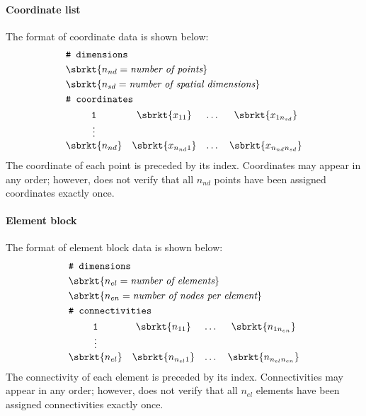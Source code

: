\paragraph{Coordinate list}
\label{sect.TahoeI.coordinates}
The format of coordinate data is shown below:
\begin{align}
& \texttt{\# dimensions} \notag \\
& \sbrkt{n_{nd} = \textit{number of points}} \notag \\
& \sbrkt{n_{sd} = \textit{number of spatial dimensions}} \notag \\
& \texttt{\# coordinates} \notag \\
& \begin{matrix}
\texttt{1} & \sbrkt{x_{11}} & \dots  & \sbrkt{x_{1n_{sd}}} \\
\vdots \\
\sbrkt{n_{nd}}  & \sbrkt{x_{n_{nd}1}} & \dots & \sbrkt{x_{n_{nd}n_{sd}}}
\end{matrix} \notag
\end{align}
The coordinate of each point is preceded by its index. Coordinates 
may appear in any order; however, \tahoe does not verify that all 
$n_{nd}$ points have been assigned coordinates exactly once.

\paragraph{Element block}
\label{sect.TahoeI.elements}
The format of element block data is shown below:
\begin{align}
& \texttt{\# dimensions} \notag \\
& \sbrkt{n_{el} = \textit{number of elements}} \notag \\
& \sbrkt{n_{en} = \textit{number of nodes per element}} \notag \\
& \texttt{\# connectivities} \notag \\
& \begin{matrix}
\texttt{1} & \sbrkt{n_{11}} & \dots  & \sbrkt{n_{1n_{en}}} \\
\vdots \\
\sbrkt{n_{el}} & \sbrkt{n_{n_{el}1}} & \dots & \sbrkt{n_{n_{el}n_{en}}}
\end{matrix} \notag
\end{align}
The connectivity of each element is preceded by its index. 
Connectivities may appear in any order; 
however, \tahoe does not verify that all $n_{el}$ 
elements have been assigned connectivities exactly once.

